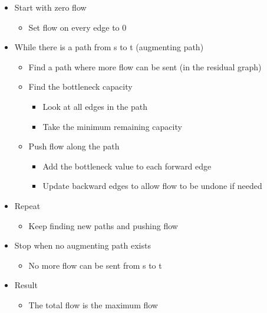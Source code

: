 \documentclass[11pt]{article}
\providecommand{\tightlist}{%
      \setlength{\itemsep}{0pt}\setlength{\parskip}{0pt}}
\begin{document}
\begin{itemize}
\tightlist
\item
  Start with zero flow

  \begin{itemize}
  \tightlist
  \item
    Set flow on every edge to 0
  \end{itemize}
\item
  While there is a path from s to t (augmenting path)

  \begin{itemize}
  \tightlist
  \item
    Find a path where more flow can be sent (in the residual graph)
  \item
    Find the bottleneck capacity

    \begin{itemize}
    \tightlist
    \item
      Look at all edges in the path
    \item
      Take the minimum remaining capacity
    \end{itemize}
  \item
    Push flow along the path

    \begin{itemize}
    \tightlist
    \item
      Add the bottleneck value to each forward edge
    \item
      Update backward edges to allow flow to be undone if needed
    \end{itemize}
  \end{itemize}
\item
  Repeat

  \begin{itemize}
  \tightlist
  \item
    Keep finding new paths and pushing flow
  \end{itemize}
\item
  Stop when no augmenting path exists

  \begin{itemize}
  \tightlist
  \item
    No more flow can be sent from s to t
  \end{itemize}
\item
  Result

  \begin{itemize}
  \tightlist
  \item
    The total flow is the maximum flow
  \end{itemize}
\end{itemize}
\end{document}
